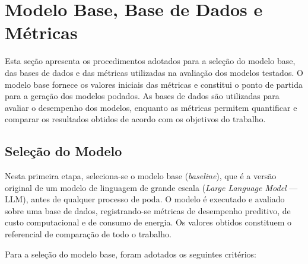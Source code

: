 \section{Modelo Base, Base de Dados e Métricas}\label{sec:metodologia_modelo}

Esta seção apresenta os procedimentos adotados para a seleção do modelo base, das bases de dados e das métricas utilizadas na avaliação dos modelos testados. O modelo base fornece os valores iniciais das métricas e constitui o ponto de partida para a geração dos modelos podados. As bases de dados são utilizadas para avaliar o desempenho dos modelos, enquanto as métricas permitem quantificar e comparar os resultados obtidos de acordo com os objetivos do trabalho.

\subsection{Seleção do Modelo}\label{subsec:metodologia_selecao_modelo}

Nesta primeira etapa, seleciona-se o modelo base (\textit{baseline}), que é a versão
original de um modelo de linguagem de grande escala (\textit{Large Language Model} ---
LLM), antes de qualquer processo de poda. O modelo é executado e
avaliado sobre uma base de dados, registrando-se métricas de desempenho preditivo, de custo
computacional e de consumo de energia. Os valores obtidos constituem o referencial de
comparação de todo o trabalho.


Para a seleção do modelo base, foram adotados os seguintes critérios:

